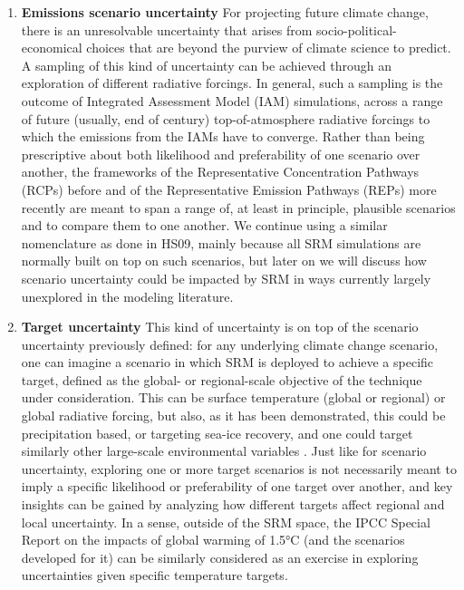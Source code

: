 \documentclass[acp, manuscript]{copernicus}
\begin{document}
\begin{enumerate}
    \item \textbf{Emissions scenario uncertainty} For projecting future climate change, there is an unresolvable uncertainty that arises from  socio-political-economical choices that are beyond the purview of climate science to predict. A sampling of this kind of uncertainty can be achieved through an exploration of different radiative forcings. In general, such a sampling is the outcome of Integrated Assessment Model (IAM) simulations, across a range of future (usually, end of century) top-of-atmosphere radiative forcings to which the emissions from the IAMs have to converge. Rather than being prescriptive about both likelihood and preferability of one scenario over another, the frameworks of the Representative Concentration Pathways (RCPs) before and of the Representative Emission Pathways (REPs) more recently are meant to span a range of, at least in principle, plausible scenarios and to compare them to one another. We continue using a similar nomenclature as done in HS09, mainly because all SRM simulations are normally built on top on such scenarios, but later on we will discuss how scenario uncertainty could be impacted by SRM in ways currently largely unexplored in the modeling literature.
    
    \item \textbf{Target uncertainty} This kind of uncertainty is on top of the scenario uncertainty previously defined: for any underlying climate change scenario, one can imagine a scenario in which SRM is deployed to achieve a specific target, defined as the global- or regional-scale objective of the technique under consideration. This can be surface temperature (global or regional) or global radiative forcing, but also, as it has been demonstrated, this could be precipitation based, or targeting sea-ice recovery, and one could target similarly other large-scale environmental variables \citep{Lee-etal-2020}. Just like for scenario uncertainty, exploring one or more target scenarios is not necessarily meant to imply a specific likelihood or preferability of one target over another, and key insights can be gained by analyzing how different targets affect regional and local uncertainty. In a sense, outside of the SRM space, the IPCC Special Report on the impacts of global warming of 1.5°{C} \citep{IPCC_2018_SR15} (and the scenarios developed  for it) can be similarly considered as an exercise in exploring uncertainties given specific temperature targets.\\
    

\end{enumerate}
\end{document}
